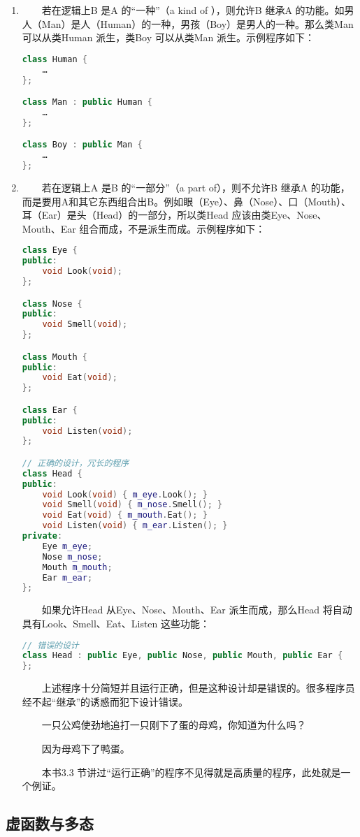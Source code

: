 \documentclass[11pt]{article}
\begin{document}
\begin{enumerate}
\item 　　若在逻辑上B 是A 的“一种”（a kind of ），则允许B 继承A 的功能。如男人（Man）是人（Human）的一种，男孩（Boy）是男人的一种。那么类Man 可以从类Human 派生，类Boy 可以从类Man 派生。示例程序如下：
\label{sec-1-2-2-1}
\begin{lstlisting}[language=c++]
class Human {
    …
};

class Man : public Human {
    …
};

class Boy : public Man {
    …
};
\end{lstlisting}
\item 　　若在逻辑上A 是B 的“一部分”（a part of），则不允许B 继承A 的功能，而是要用A和其它东西组合出B。例如眼（Eye）、鼻（Nose）、口（Mouth）、耳（Ear）是头（Head）的一部分，所以类Head 应该由类Eye、Nose、Mouth、Ear 组合而成，不是派生而成。示例程序如下：
\label{sec-1-2-2-2}
\begin{lstlisting}[language=c++]
class Eye {
public:
    void Look(void);
};

class Nose {
public:
    void Smell(void);
};

class Mouth {
public:
    void Eat(void);
};

class Ear {
public:
    void Listen(void);
};

// 正确的设计，冗长的程序
class Head {
public:
    void Look(void) { m_eye.Look(); }
    void Smell(void) { m_nose.Smell(); }
    void Eat(void) { m_mouth.Eat(); }
    void Listen(void) { m_ear.Listen(); }
private:
    Eye m_eye;
    Nose m_nose;
    Mouth m_mouth;
    Ear m_ear;
};
\end{lstlisting}

　　如果允许Head 从Eye、Nose、Mouth、Ear 派生而成，那么Head 将自动具有Look、Smell、Eat、Listen 这些功能：
\begin{lstlisting}[language=c++]
// 错误的设计
class Head : public Eye, public Nose, public Mouth, public Ear {
};
\end{lstlisting}

　　上述程序十分简短并且运行正确，但是这种设计却是错误的。很多程序员经不起“继承”的诱惑而犯下设计错误。

　　一只公鸡使劲地追打一只刚下了蛋的母鸡，你知道为什么吗？

　　因为母鸡下了鸭蛋。

　　本书3.3 节讲过“运行正确”的程序不见得就是高质量的程序，此处就是一个例证。
\end{enumerate}
\subsection{虚函数与多态}
\label{sec-1-3}
\end{document}
